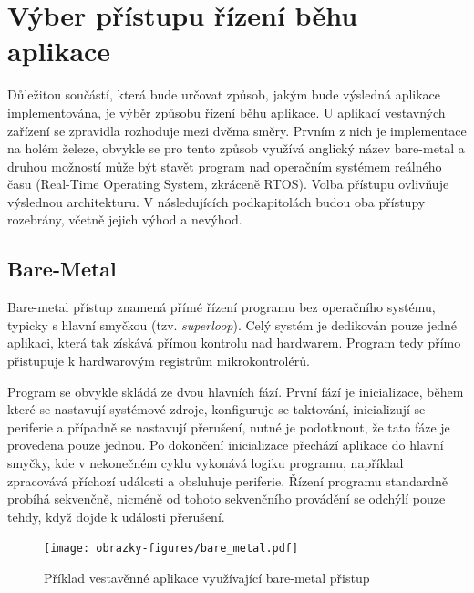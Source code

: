 \newpage

\section{Výber přístupu řízení běhu aplikace}
Důležitou součástí, která bude určovat způsob, jakým bude výsledná aplikace implementována, je výběr způsobu řízení běhu aplikace. U aplikací vestavných zařízení se zpravidla rozhoduje mezi dvěma směry. Prvním z nich je implementace na holém železe, obvykle se pro tento způsob využívá anglický název bare-metal a druhou možností může být stavět program nad operačním systémem reálného času (Real-Time Operating System, zkráceně RTOS). Volba přístupu ovlivňuje výslednou architekturu. V následujících podkapitolách budou oba přístupy rozebrány, včetně jejich výhod a nevýhod. 


\subsection{Bare-Metal}
Bare-metal přístup znamená přímé řízení programu bez operačního systému, typicky s hlavní smyčkou (tzv. \emph{superloop}). Celý systém je dedikován pouze jedné aplikaci, která tak získává přímou kontrolu nad hardwarem. Program tedy přímo přistupuje k hardwarovým registrům mikrokontrolérů. 

Program se obvykle skládá ze dvou hlavních fází. První fází je inicializace, během které se nastavují systémové zdroje, konfiguruje se taktování, inicializují se periferie a případně se nastavují přerušení, nutné je podotknout, že tato fáze je provedena pouze jednou. Po dokončení inicializace přechází aplikace do hlavní smyčky, kde v nekonečném cyklu vykonává logiku programu, například zpracovává příchozí události a obsluhuje periferie. Řízení programu standardně probíhá sekvenčně, nicméně od tohoto sekvenčního provádění se odchýlí pouze tehdy, když dojde k události přerušení.

\begin{figure}[h]
    \centering
    \texttt{[image: obrazky-figures/bare\_metal.pdf]}
    
    \caption{Příklad vestavěnné aplikace využívající bare-metal přistup}
    \label{fig:bare-metal}
\end{figure}

\newpage

